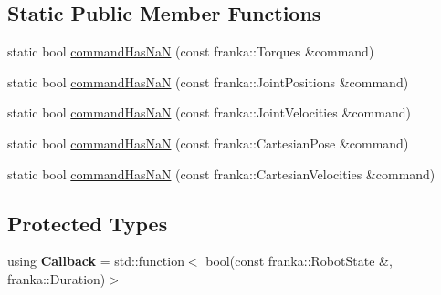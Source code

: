 \subsection*{Static Public Member Functions}
\begin{DoxyCompactItemize}
\item 
static bool \hyperlink{classfranka__hw_1_1_franka_h_w_a673cc620d6acb15625f6403d96c75f4e}{command\+Has\+NaN} (const franka\+::\+Torques \&command)
\item 
static bool \hyperlink{classfranka__hw_1_1_franka_h_w_a32f7dda7266b381a4c779993b4d0185f}{command\+Has\+NaN} (const franka\+::\+Joint\+Positions \&command)
\item 
static bool \hyperlink{classfranka__hw_1_1_franka_h_w_a56bc8a84589c605327e9bbcb64809fe1}{command\+Has\+NaN} (const franka\+::\+Joint\+Velocities \&command)
\item 
static bool \hyperlink{classfranka__hw_1_1_franka_h_w_aeec15cdb4cd9edb0976e96c63b62f93c}{command\+Has\+NaN} (const franka\+::\+Cartesian\+Pose \&command)
\item 
static bool \hyperlink{classfranka__hw_1_1_franka_h_w_ac408df87375bb8cfde94f4e5bf4a16c2}{command\+Has\+NaN} (const franka\+::\+Cartesian\+Velocities \&command)
\end{DoxyCompactItemize}
\subsection*{Protected Types}
\begin{DoxyCompactItemize}
\item 
\mbox{\label{classfranka__hw_1_1_franka_h_w_ac576bd5140a03864888c68519daa5aa4}} 
using {\bfseries Callback} = std\+::function$<$ bool(const franka\+::\+Robot\+State \&, franka\+::\+Duration)$>$
\end{DoxyCompactItemize}
